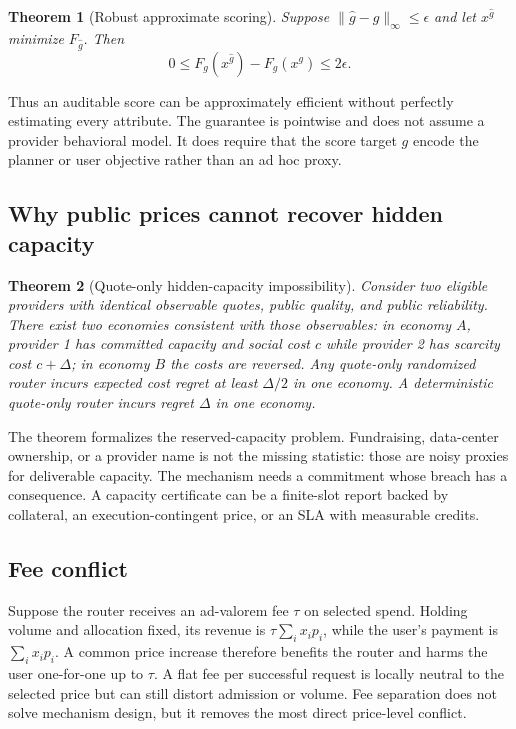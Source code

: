 \documentclass[sigconf,nonacm]{acmart}
\newtheorem{theorem}{Theorem}
\newcommand{\1}{\mathbf 1}
\begin{document}
\begin{theorem}[Robust approximate scoring]
\label{thm:robust}
Suppose $\|\widehat g-g\|_\infty\le\epsilon$ and let $x^{\widehat g}$ minimize
$F_{\widehat g}$.  Then
\begin{equation}
0\le F_g(x^{\widehat g})-F_g(x^g)\le 2\epsilon.
\end{equation}
\end{theorem}

Thus an auditable score can be approximately efficient without perfectly
estimating every attribute.  The guarantee is pointwise and does not assume a
provider behavioral model.  It does require that the score target $g$ encode the
planner or user objective rather than an ad hoc proxy.

\subsection{Why public prices cannot recover hidden capacity}

\begin{theorem}[Quote-only hidden-capacity impossibility]
\label{thm:impossibility}
Consider two eligible providers with identical observable quotes, public quality,
and public reliability.  There exist two economies consistent with those
observables: in economy $A$, provider 1 has committed capacity and social cost
$c$ while provider 2 has scarcity cost $c+\Delta$; in economy $B$ the costs are
reversed.  Any quote-only randomized router incurs expected cost regret at least
$\Delta/2$ in one economy.  A deterministic quote-only router incurs regret
$\Delta$ in one economy.
\end{theorem}

The theorem formalizes the reserved-capacity problem.  Fundraising, data-center
ownership, or a provider name is not the missing statistic: those are noisy
proxies for deliverable capacity.  The mechanism needs a commitment whose breach
has a consequence.  A capacity certificate can be a finite-slot report backed
by collateral, an execution-contingent price, or an SLA with measurable credits.

\subsection{Fee conflict}

Suppose the router receives an ad-valorem fee $\tau$ on selected spend.  Holding
volume and allocation fixed, its revenue is $\tau\sum_i x_ip_i$, while the user's
payment is $\sum_ix_ip_i$.  A common price increase therefore benefits the
router and harms the user one-for-one up to $\tau$.  A flat fee per successful
request is locally neutral to the selected price but can still distort admission
or volume.  Fee separation does not solve mechanism design, but it removes the
most direct price-level conflict.
\end{document}
